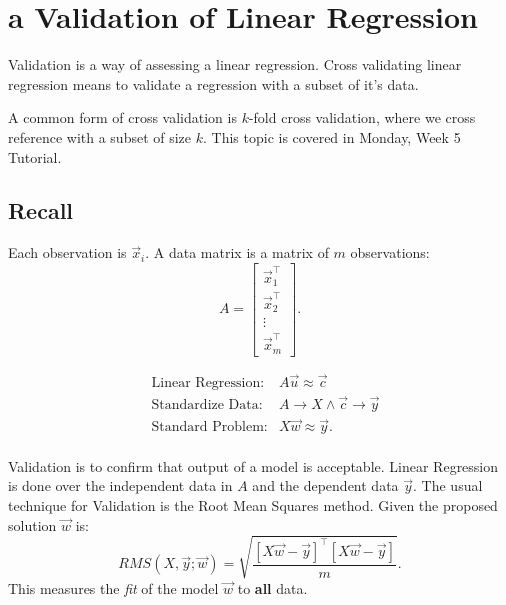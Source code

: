 \documentclass[12pt]{book}
\title{\coursetitle\linebreak\lecturename}
\author{\\Cain Susko\\ 
           \\ \\ \\
      Queen's University 
    \\School of Computing\\}
\begin{document}
\begin{titlepage}
        \maketitle
\end{titlepage}


\section*{a Validation of Linear Regression}
Validation is a way of assessing a linear regression. Cross validating linear regression means to validate a regression with a subset of it's
        data.

A common form of cross validation is $k$-fold cross validation, where  we cross reference with a subset of size $k$. This topic is covered in
        Monday, Week 5 Tutorial.

\subsection*{Recall}
Each observation is $\vec x_i$. A data matrix is a matrix of $m$ observations: 
\[
A = \begin{bmatrix} \vec x_1^\top\\\vec x_2^\top\\\vdots\\\vec x_m^\top\end{bmatrix} 
.\] 


\begin{align*}
        &\text{Linear Regression:} &A\vec u \approx \vec c\\
        &\text{Standardize Data:} &A\to X \wedge \vec c \to \vec y\\
        &\text{Standard Problem:} &X\vec w \approx \vec y
.\end{align*}

\paragraph{}
Validation is to confirm that output of a model is acceptable.
Linear Regression is done over the independent data in $A$ and the dependent data  $\vec y$.
The usual technique for Validation is the Root Mean Squares method. 
Given the proposed solution $\vec w$ is:
 \[
RMS\left( X,\vec y; \vec w \right) = \sqrt{\frac{[X\vec w - \vec y]^\top [X\vec w - \vec y]}{m}}  
.\] 
This measures the \textit{fit} of the model $\vec w$ to \textbf{all} data.
\pagebreak
\end{document}
